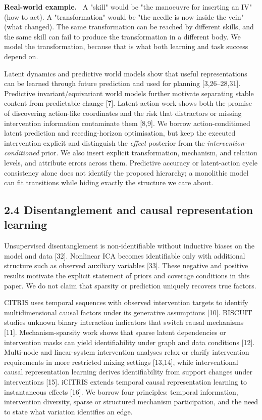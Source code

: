 \documentclass[11pt]{article}
\newenvironment{example}{%
  \par\smallskip\noindent\begin{minipage}{\textwidth}%
  \color{teal!60!black}\small
  \textbf{\color{teal!70!black}Real-world example.}\
}{%
  \end{minipage}\par\smallskip}
\begin{document}
\begin{example}
A "skill" would be "the manoeuvre for inserting an IV" (how to act). A "transformation" would be "the needle is now inside the
vein" (what changed). The same transformation can be reached by different skills, and the same skill can fail to produce the
transformation in a different body. We model the transformation, because that is what both learning and task success depend on.
\end{example}

Latent dynamics and predictive world models show that useful representations can be learned through future prediction and used for
planning [3,26--28,31]. Predictive invariant/equivariant world models further motivate separating stable content from predictable
change [7]. Latent-action work shows both the promise of discovering action-like coordinates and the risk that distractors or
missing intervention information contaminate them [8,9]. We borrow action-conditioned latent prediction and receding-horizon
optimisation, but keep the executed intervention explicit and distinguish the \emph{effect} posterior from the
\emph{intervention-conditioned} prior. We also insert explicit transformation, mechanism, and relation levels, and attribute errors
across them. Predictive accuracy or latent-action cycle consistency alone does not identify the proposed hierarchy; a monolithic
model can fit transitions while hiding exactly the structure we care about.

\subsection*{2.4 Disentanglement and causal representation learning}

Unsupervised disentanglement is non-identifiable without inductive biases on the model and data [32]. Nonlinear ICA becomes
identifiable only with additional structure such as observed auxiliary variables [33]. These negative and positive results motivate
the explicit statement of priors and coverage conditions in this paper. We do not claim that sparsity or prediction uniquely
recovers true factors.

CITRIS uses temporal sequences with observed intervention targets to identify multidimensional causal factors under its generative
assumptions [10]. BISCUIT studies unknown binary interaction indicators that switch causal mechanisms [11]. Mechanism-sparsity work
shows that sparse latent dependencies or intervention masks can yield identifiability under graph and data conditions [12].
Multi-node and linear-system intervention analyses relax or clarify intervention requirements in more restricted mixing settings
[13,14], while interventional causal representation learning derives identifiability from support changes under interventions [15].
iCITRIS extends temporal causal representation learning to instantaneous effects [16]. We borrow four principles: temporal
information, intervention diversity, sparse or structured mechanism participation, and the need to state what variation identifies
an edge.
\end{document}
